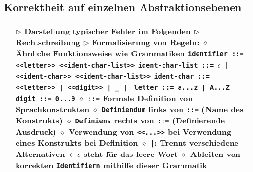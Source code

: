 \subsection*{Korrektheit auf einzelnen Abstraktionsebenen}

	\begin{longtable}{ | p{} p{} | } 
	\hline 
	
	\makecell[l]{Lexikalische Ebene} & \makecell[l]{
	$\triangleright$ Darstellung typischer Fehler im Folgenden \\
	$\triangleright$ Rechtschreibung \\
	$\triangleright$ Formalisierung von Regeln: \\
	\hspace{0.4cm} $\diamond$ Ähnliche Funktionsweise wie Grammatiken \\
	\hspace{0.6cm} \texttt{identifier ::= <<letter>> <<ident-char-list>>} \\
	\hspace{0.6cm} \texttt{ident-char-list ::= $\epsilon$ | <<ident-char>> <<ident-char-list>>} \\ 
	\hspace{0.6cm} \texttt{ident-char ::= <<letter>> | <<digit>> | \_ | \textdollar} \\
	\hspace{0.6cm} \texttt{letter ::= a...z | A...Z} \\
	\hspace{0.6cm} \texttt{digit ::= 0...9} \\
	\hspace{0.4cm} $\diamond$ \texttt{::=} Formale Definition von Sprachkonstrukten \\
	\hspace{0.4cm} $\diamond$ \texttt{Definiendum} links von \texttt{::=} (Name des Konstrukts) \\
	\hspace{0.4cm} $\diamond$ \texttt{Definiens} rechts von \texttt{::=} (Definierende Ausdruck) \\
	\hspace{0.4cm} $\diamond$ Verwendung von \texttt{<<...>>} bei Verwendung eines Konstrukts bei Definition \\
	\hspace{0.4cm} $\diamond$ \texttt{|}: Trennt verschiedene Alternativen \\ 
	\hspace{0.4cm} $\diamond$ $\epsilon$ steht für das leere Wort \\
	\hspace{0.4cm} $\diamond$ Ableiten von korrekten \texttt{Identifiern} mithilfe dieser Grammatik}  \\ \hline
	

\end{longtable}
